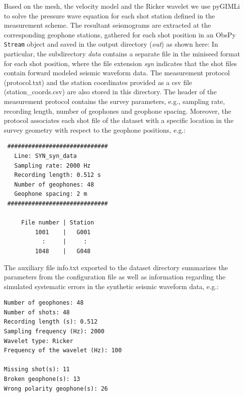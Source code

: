 \documentclass[a4paper,fleqn]{cas-sc}
\begin{document}
Based on the mesh, the velocity model and the Ricker wavelet we use pyGIMLi 
to solve the pressure wave equation for each shot station defined in the measurement scheme.
The resultant seismograms are extracted at the corresponding geophone stations, gathered for each shot position in an ObsPy \texttt{Stream} object and saved in the output directory (\textit{out}) as shown here:
In particular, the subdirectory \textit{data} contains a separate file in the miniseed format \citep{ahern2012, ringler2015} for each shot position, where the file extension \textit{syn} indicates that the shot files contain forward modeled seismic waveform data. 
The measurement protocol (protocol.txt) and the station coordinates provided as a csv file (station\_coords.csv) are also stored in this directory. The header of the measurement protocol contains the survey parameters, e.g., sampling rate, recording length, number of geophones and geophone spacing. Moreover, the protocol associates each shot file of the dataset with a specific location in the survey geometry with respect to the geophone positions, e.g.:
\begin{footnotesize}
\begin{verbatim}
 #############################
   Line: SYN_syn_data             
   Sampling rate: 2000 Hz    
   Recording length: 0.512 s 
   Number of geophones: 48   
   Geophone spacing: 2 m     
 #############################
 
     File number | Station
         1001    |   G001
           :     |     :
         1048    |   G048
\end{verbatim}
\end{footnotesize}
The auxiliary file info.txt exported to the dataset directory summarizes the parameters from the configuration file as well as information regarding the simulated systematic errors in the synthetic seismic waveform data, e.g.:
\begin{footnotesize}
\begin{verbatim}
Number of geophones: 48
Number of shots: 48
Recording length (s): 0.512
Sampling frequency (Hz): 2000
Wavelet type: Ricker
Frequency of the wavelet (Hz): 100

Missing shot(s): 11
Broken geophone(s): 13
Wrong polarity geophone(s): 26
\end{verbatim}
\end{footnotesize}
\end{document}
